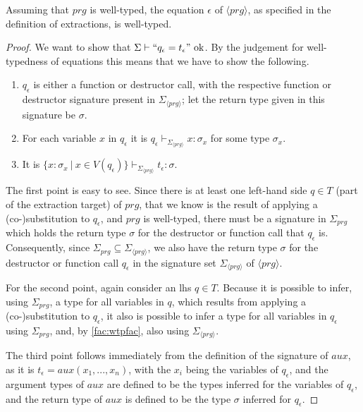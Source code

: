 \begin{lemma}
Assuming that $prg$ is well-typed, the equation $\epsilon$ of $\langle prg \rangle$, as specified in the definition of extractions, is well-typed.

\begin{proof}
We want to show that $\Sigma \vdash `` q_\epsilon = t_\epsilon " \textrm{ ok}$. By the judgement for well-typedness of equations this means that we have to show the following.
\begin{enumerate}
\item $q_\epsilon$ is either a function or destructor call, with the respective function or destructor signature present in $\Sigma_{\langle prg \rangle}$; let the return type given in this signature be $\sigma$.

\item For each variable $x$ in $q_\epsilon$ it is $q_\epsilon \vdash_{\Sigma_{\langle prg \rangle}} x : \sigma_x$ for some type $\sigma_x$.

\item It is $\{ x : \sigma_x ~ | ~ x \in V(q_\epsilon) \} \vdash_{\Sigma_{\langle prg \rangle}} t_\epsilon : \sigma$.
\end{enumerate}
The first point is easy to see. Since there is at least one left-hand side $q \in T$ (part of the extraction target) of $prg$, that we know is the result of applying a (co-)substitution to $q_\epsilon$, and $prg$ is well-typed, there must be a signature in $\Sigma_{prg}$ which holds the return type $\sigma$ for the destructor or function call that $q_\epsilon$ is. Consequently, since $\Sigma_{prg} \subseteq \Sigma_{\langle prg \rangle}$, we also have the return type $\sigma$ for the destructor or function call $q_\epsilon$ in the signature set $\Sigma_{\langle prg \rangle}$ of $\langle prg \rangle$.

For the second point, again consider an lhs $q \in T$. Because it is possible to infer, using $\Sigma_{prg}$, a type for all variables in $q$, which results from applying a (co-)substitution to $q_\epsilon$, it also is possible to infer a type for all variables in $q_\epsilon$ using $\Sigma_{prg}$, and, by \autoref{fac:wtpfac}, also using $\Sigma_{\langle prg \rangle}$.

The third point follows immediately from the definition of the signature of $aux$, as it is $t_\epsilon = aux(x_1, ..., x_n)$, with the $x_i$ being the variables of $q_\epsilon$, and the argument types of $aux$ are defined to be the types inferred for the variables of $q_\epsilon$, and the return type of $aux$ is defined to be the type $\sigma$ inferred for $q_\epsilon$.
\end{proof}
\end{lemma}

